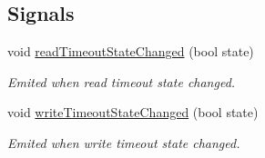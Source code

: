 \subsection*{Signals}
\begin{DoxyCompactItemize}
\item 
\hypertarget{classmdt_abstract_port_a62c5e1f2beb6eddf740c8710ecb84ad1}{
void \hyperlink{classmdt_abstract_port_a62c5e1f2beb6eddf740c8710ecb84ad1}{readTimeoutStateChanged} (bool state)}
\label{classmdt_abstract_port_a62c5e1f2beb6eddf740c8710ecb84ad1}

\begin{DoxyCompactList}\small\item\em Emited when read timeout state changed. \end{DoxyCompactList}\item 
\hypertarget{classmdt_abstract_port_abd4a3e5738ac13167ddaafe95926ce4d}{
void \hyperlink{classmdt_abstract_port_abd4a3e5738ac13167ddaafe95926ce4d}{writeTimeoutStateChanged} (bool state)}
\label{classmdt_abstract_port_abd4a3e5738ac13167ddaafe95926ce4d}

\begin{DoxyCompactList}\small\item\em Emited when write timeout state changed. \end{DoxyCompactList}\end{DoxyCompactItemize}
